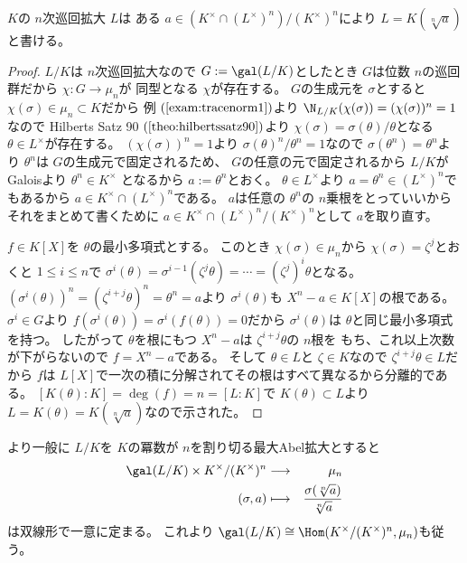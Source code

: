 \documentclass[../master_galois_theory]{subfiles}
\begin{document}
\begin{theo} \label{theo:12.11}
  $K$の $n$次巡回拡大 $L$は
  ある $a \in (K^\times \cap (L^\times)^n)/(K^\times)^n$により
  $L = K(\sqrt[n]{a})$と書ける。
\end{theo}

\begin{proof}
  $L/K$は $n$次巡回拡大なので $G := \gal(L/K)$としたとき
  $G$は位数 $n$の巡回群だから $\chi : G \longrightarrow \mu_n$が
  同型となる $\chi$が存在する。
  $G$の生成元を $\sigma$とすると $\chi(\sigma) \in \mu_n \subset K$だから
  例 $(\mathrm{\ref{exam:tracenorm1}})$より
  $\N_{L/K}(\chi(\sigma)) = (\chi(\sigma))^n = 1$なので
  \rm{Hilberts Satz 90} $(\mathrm{\ref{theo:hilbertssatz90}})$より
  $\chi(\sigma) = \sigma(\theta)/\theta$となる $\theta \in L^\times$が存在する。
  $(\chi(\sigma))^n = 1$より $\sigma(\theta)^n/\theta^n = 1$なので
  $\sigma(\theta^n) = \theta^n$より $\theta^n$は $G$の生成元で固定されるため、
  $G$の任意の元で固定されるから $L/K$が\rm{Galois}より $\theta^n \in K^\times$
  となるから $a := \theta^n$とおく。
  $\theta \in L^\times$より $a = \theta^n \in (L^\times)^n$でもあるから
  $a \in K^\times \cap (L^\times)^n$である。
  $a$は任意の $\theta^n$の $n$乗根をとっていいからそれをまとめて書くために
  $a \in K^\times \cap (L^\times)^n / (K^\times)^n$として $a$を取り直す。

  $f \in K[X]$を $\theta$の最小多項式とする。
  このとき $\chi(\sigma) \in \mu_n$から $\chi(\sigma) = \zeta^j$とおくと
  $1 \leq i \leq n$で
  $\sigma^i(\theta) = \sigma^{i-1}(\zeta^j \theta) = \cdots = (\zeta^j)^i \theta$となる。
  $(\sigma^i(\theta))^n = (\zeta^{i + j} \theta)^n = \theta^n = a$より
  $\sigma^i(\theta)$も $X^n - a \in K[X]$の根である。
  $\sigma^i \in G$より $f(\sigma^i(\theta)) = \sigma^i(f(\theta)) = 0$だから
  $\sigma^i(\theta)$は $\theta$と同じ最小多項式を持つ。
  したがって $\theta$を根にもつ $X^n - a$は $\zeta^{i + j} \theta$の $n$根を
  もち、これ以上次数が下がらないので $f = X^n - a$である。
  そして $\theta \in L$と $\zeta \in K$なので $\zeta^{i + j} \theta \in L$だから $f$は $L[X]$で一次の積に分解されてその根はすべて異なるから分離的である。
  $[K(\theta):K] = \deg(f) = n = [L:K]$で $K(\theta) \subset L$より
  $L = K(\theta) = K(\sqrt[n]{a})$なので示された。
\end{proof}

\begin{fact}
  より一般に $L/K$を $K$の冪数が $n$を割り切る最大\rm{Abel}拡大とすると
  \begin{eqnarray*}
    \gal(L/K) \times K^\times/(K^\times)^n & \longrightarrow & \mu_n \\
    (\sigma , a) & \longmapsto & \frac{\sigma(\sqrt[n]{a})}{\sqrt[n]{a}}
  \end{eqnarray*}
  は双線形で一意に定まる。
  これより
  $\gal(L/K) \cong \Hom(K^\times/(K^\times)^n , \mu_n)$も従う。
\end{fact}
\end{document}
